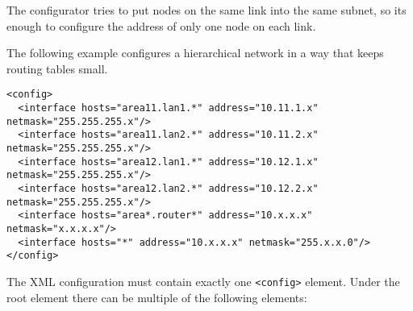 The configurator tries to put nodes on the same link into the same subnet,
so its enough to configure the address of only one node on each link.

The following example configures a hierarchical network in a way that keeps
routing tables small.
\begin{verbatim}
<config>
  <interface hosts="area11.lan1.*" address="10.11.1.x" netmask="255.255.255.x"/>
  <interface hosts="area11.lan2.*" address="10.11.2.x" netmask="255.255.255.x"/>
  <interface hosts="area12.lan1.*" address="10.12.1.x" netmask="255.255.255.x"/>
  <interface hosts="area12.lan2.*" address="10.12.2.x" netmask="255.255.255.x"/>
  <interface hosts="area*.router*" address="10.x.x.x" netmask="x.x.x.x"/>
  <interface hosts="*" address="10.x.x.x" netmask="255.x.x.0"/>
</config>
\end{verbatim}

The XML configuration must contain exactly one \verb!<config>! element. Under the
root element there can be multiple of the following elements:

